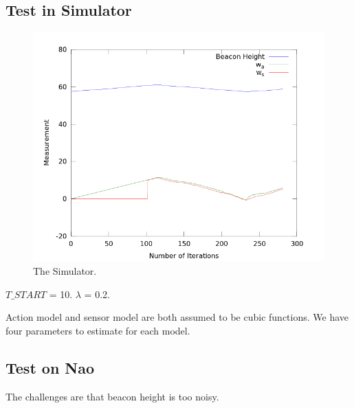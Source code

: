\documentclass[10pt]{IEEEtran}
\begin{document}
\subsection{Test in Simulator}

\begin{figure}
\centering
\includegraphics[width=\columnwidth]{simResult.png}
\caption{The Simulator.}
\label{fig:fuelworld}
\end{figure}


$T\_START$ = 10. $\lambda$ = 0.2. 

Action model and sensor model are both assumed to be cubic functions.
We have four parameters to estimate for each model.

\subsection{Test on Nao}

The challenges are that beacon height is too noisy.
\end{document}
